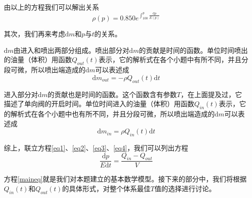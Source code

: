 \documentclass[12pt,AutoFakeBold]{article}%
\newcommand{\dif}{\mathrm{d}}
\begin{document}
    由以上的方程我们可以解出关系
    \begin{equation}
        \rho(p)=0.850e^{\int^p_{100}\frac{\dif p}{E(p)}}
        \label{eq2}
    \end{equation}
    \par
    其次，我们再来考虑$\dif m$和$p$与$t$的关系。\par
    $\dif m$由进入和喷出两部分组成。喷出部分对$\dif m$的贡献是时间的函数。单位时间喷出的油量（体积）用函数$Q_{out}(t)$表示，它的解析式在各个小题中有所不同，并且分段可微，所以喷出端造成的$\dif m$可以表述成
    \begin{equation}
        \dif m_{out}=-\rho Q_{out}(t)\dif t
        \label{eq3}
    \end{equation}\par
    进入部分对$\dif m$的贡献也是时间的函数。这个函数含有参数$T$，在上面提及过，它描述了单向阀的开启时间。单位时间进入的油量（体积）用函数$Q_{in}(t)$表示，它的解析式在各个小题中也有所不同，并且分段可微，所以喷出端造成的$\dif m$可以表述成
    \begin{equation}
        \dif m_{in}=\rho Q_{in}(t)\dif t
        \label{eq4}
    \end{equation}\par
    综上，联立方程\ref{eq1}、\ref{eq2}、\ref{eq3}、\ref{eq4}，我们可以列出方程
    \begin{equation}
        \frac{\dif p}{E\dif t}=\frac{Q_{in}-Q_{out}}{V}
        \label{maineq}
    \end{equation}\par
    方程\ref{maineq}就是我们对本题建立的基本数学模型。接下来的部分中，我们将根据$Q_{in}(t)$和$Q_{out}(t)$的具体形式，对整个体系最佳$T$值的选择进行讨论。
    
\end{document}
